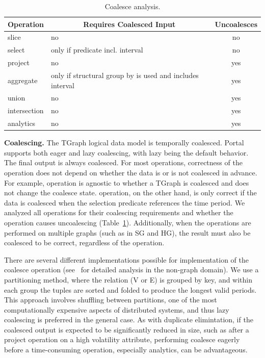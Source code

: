 \begin{table}
\small
\begin{tabular}{ l | p{4cm} | c }
\hline
\multicolumn{1}{l|}{\bfseries Operation} & \multicolumn{1}{c|}{\bfseries Requires Coalesced Input} & \multicolumn{1}{c}{\bfseries Uncoalesces} \\ \hline
slice & no & no \\ \hline
select & only if predicate incl. interval & no \\ \hline
project & no & yes \\ \hline
aggregate & only if structural group by is used and includes interval & yes \\ \hline
union & no & yes \\ \hline
intersection & no & yes \\ \hline
analytics & no & yes \\
\hline
\end{tabular}
\caption{Coalesce analysis.}
\label{tab:coalesce}
\end{table}

{\bf Coalescing.}  The TGraph logical data model is temporally
coalesced.  Portal supports both eager and lazy coalescing, with lazy
being the default behavior.  The final output is always coalesced.
For most operations, correctness of the operation does not depend on
whether the data is or is not coalesced in advance.  For example,
 operation is agnostic to whether a TGraph is coalesced
and does not change the coalesce state.   operation, on
the other hand, is only correct if the data is coalesced when the
selection predicate references the time period.  We analyzed all
operations for their coalescing requirements and whether the operation
causes uncoalescing (Table~\ref{tab:coalesce}).  Additionally, when
the operations are performed on multiple graphs (such as in SG and
HG), the result must also be coalesced to be correct, regardless of
the operation.

There are several different implementations possible for
implementation of the coalesce operation
(see~\cite{DBLP:conf/vldb/BohlenSS96} for detailed analysis in the
non-graph domain).  We use a partitioning method, where the relation
(V or E) is grouped by key, and within each group the tuples are
sorted and folded to produce the longest valid periods.  This approach
involves shuffling between partitions, one of the most computationally
expensive aspects of distributed systems, and thus lazy coalescing is
preferred in the general case.  As with duplicate elimintation, if the
coalesced output is expected to be significantly reduced in size, such
as after a project operation on a high volatility attribute,
performing coalesce eagerly before a time-consuming operation,
especially analytics, can be advantageous.

